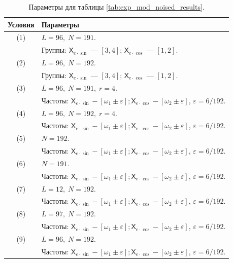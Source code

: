 \documentclass[12pt, specialist, subf
]{disser}
\theoremstyle{definition}
\newcommand{\TS}{\mathsf{X}}
\begin{document}
\begin{table}[H]
  \caption{Параметры для таблицы \ref{tab:exp_mod_noised_results}.}
  \centering
  \label{tab:exp_mod_noised_parameters}
  \begin{tabularx}{\textwidth}{|c|X|}
    \hline
    \textbf{Условия} & \textbf{Параметры} \\
    \hline
    (1) & \(L = 96,\; N = 191\). \\ 
        & Группы: \(\TS_{e \cdot \sin}\) —  \([3,4]\); \(\TS_{e \cdot \cos}\) —  \([1,2]\). \\
    \hline
    (2) & \(L = 96,\; N = 192\). \\ 
        & Группы: \(\TS_{e \cdot \sin}\) —  \([3,4]\); \(\TS_{e \cdot \cos}\) —  \([1,2]\). \\
    \hline
    (3) & \(L = 96,\; N = 191,\; r = 4\). \\ 
       & Частоты: $\TS_{e \cdot \sin} - [\omega_1 \pm \varepsilon]; \TS_{e \cdot \cos} - [\omega_2 \pm \varepsilon]$, $\varepsilon = 6/192$. \\
    \hline
    (4) & \(L = 96,\; N = 192,\; r = 4\). \\ 
        & Частоты: $\TS_{e \cdot \sin} - [\omega_1 \pm \varepsilon]; \TS_{e \cdot \cos} - [\omega_2 \pm \varepsilon]$, $\varepsilon = 6/192$. \\
    \hline
    (5) & \(N = 192\). \\ 
        & Частоты: $\TS_{e \cdot \sin} - [\omega_1 \pm \varepsilon]; \TS_{e \cdot \cos} - [\omega_2 \pm \varepsilon]$, $\varepsilon = 6/192$. \\
    \hline
    (6) & \(N = 191\). \\ 
        & Частоты: $\TS_{e \cdot \sin} - [\omega_1 \pm \varepsilon]; \TS_{e \cdot \cos} - [\omega_2 \pm \varepsilon]$, $\varepsilon = 6/192$. \\
    \hline
    (7) & \(L = 12,\; N = 192\). \\ 
        & Частоты: $\TS_{e \cdot \sin} - [\omega_1 \pm \varepsilon]; \TS_{e \cdot \cos} - [\omega_2 \pm \varepsilon]$, $\varepsilon = 6/192$. \\
    \hline
    (8) & \(L = 97,\; N = 192\). \\ 
       & Частоты: $\TS_{e \cdot \sin} - [\omega_1 \pm \varepsilon]; \TS_{e \cdot \cos} - [\omega_2 \pm \varepsilon]$, $\varepsilon = 6/192$. \\
    \hline
    (9) & \(L = 96,\; N = 192\). \\ 
        & Частоты: $\TS_{e \cdot \sin} - [\omega_1 \pm \varepsilon]; \TS_{e \cdot \cos} - [\omega_2 \pm \varepsilon]$, $\varepsilon = 6/192$. \\
    \hline
  \end{tabularx}
\end{table}
\end{document}
